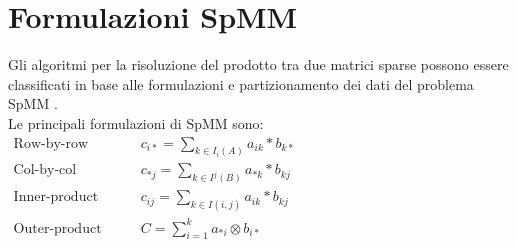 \section{Formulazioni SpMM}	\label{ChExistingTecqs:formulazioni}
Gli algoritmi per la risoluzione del prodotto tra due matrici sparse possono
essere classificati in base alle formulazioni e partizionamento dei dati del problema SpMM 
\cite{sysReviewChi}.\\ Le principali formulazioni di SpMM sono:
\voidLine
$
\begin{aligned}
\text{Row-by-row}	  &\qquad c_{i*} = \sum\limits_{k \in I_i(A)}  a_{ik} \ast  b_{k*}	\\
\text{Col-by-col}    &\qquad c_{*j} = \sum\limits_{k \in I^j(B)}  a_{*k} \ast  b_{kj}	\\
\text{Inner-product} &\qquad c_{ij} = \sum\limits_{k \in I(i,j)}  a_{ik} \ast  b_{kj}	\\
\text{Outer-product} &\qquad C = \sum\limits_{i=1}^k  a_{*i} \otimes  b_{i*}				\\
\end{aligned}
$
